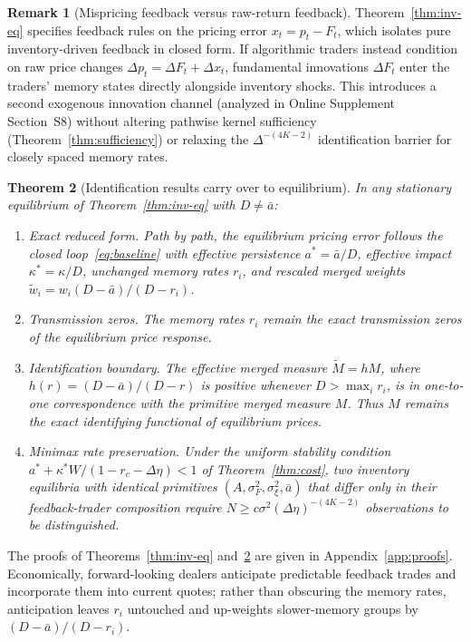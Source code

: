 \documentclass[11pt,letterpaper]{article}
\newtheorem{theorem}{Theorem}[section]
\theoremstyle{definition}
\newtheorem{remark}[theorem]{Remark}
\begin{document}
\begin{remark}[Mispricing feedback versus raw-return feedback]\label{rem:returns}
Theorem~\ref{thm:inv-eq} specifies feedback rules on the pricing error $x_t = p_t - F_t$, which isolates pure inventory-driven feedback in closed form. If algorithmic traders instead condition on raw price changes $\Delta p_t = \Delta F_t + \Delta x_t$, fundamental innovations $\Delta F_t$ enter the traders' memory states directly alongside inventory shocks. This introduces a second exogenous innovation channel (analyzed in Online Supplement Section~S8) without altering pathwise kernel sufficiency (Theorem~\ref{thm:sufficiency}) or relaxing the $\Delta^{-(4K-2)}$ identification barrier for closely spaced memory rates.
\end{remark}

\begin{theorem}[Identification results carry over to equilibrium]\label{thm:eq-id}
In any stationary equilibrium of Theorem~\ref{thm:inv-eq} with $D \neq \bar{a}$:
\begin{enumerate}
  \item[(i)] \emph{Exact reduced form.} Path by path, the equilibrium pricing error follows the closed loop~\eqref{eq:baseline} with effective persistence $a^* = \bar{a}/D$, effective impact $\kappa^* = \kappa/D$, unchanged memory rates $r_i$, and rescaled merged weights $\tilde{w}_i = w_i (D - \bar{a})/(D - r_i)$.
  \item[(ii)] \emph{Transmission zeros.} The memory rates $r_i$ remain the exact transmission zeros of the equilibrium price response.
  \item[(iii)] \emph{Identification boundary.} The effective merged measure $\tilde{M} = h M$, where $h(r) = (D - \bar{a})/(D - r)$ is positive whenever $D > \max_i r_i$, is in one-to-one correspondence with the primitive merged measure $M$. Thus $M$ remains the exact identifying functional of equilibrium prices.
  \item[(iv)] \emph{Minimax rate preservation.} Under the uniform stability condition $a^* + \kappa^* W / (1 - r_c - \Delta\eta) < 1$ of Theorem~\ref{thm:cost}, two inventory equilibria with identical primitives $(A, \sigma_F^2, \sigma_\xi^2, \bar{a})$ that differ only in their feedback-trader composition require $N \ge c \sigma^2 (\Delta\eta)^{-(4K-2)}$ observations to be distinguished.
\end{enumerate}
\end{theorem}

The proofs of Theorems~\ref{thm:inv-eq} and~\ref{thm:eq-id} are given in Appendix~\ref{app:proofs}. Economically, forward-looking dealers anticipate predictable feedback trades and incorporate them into current quotes; rather than obscuring the memory rates, anticipation leaves $r_i$ untouched and up-weights slower-memory groups by $(D - \bar{a})/(D - r_i)$.
\end{document}
